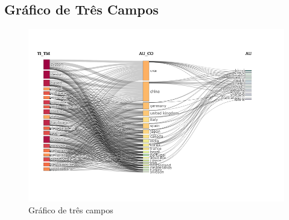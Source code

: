 \subsection{Gráfico de Três Campos}

\begin{figure}[ht]
    \centering
    \includegraphics[width=12cm]{experiments/GMalme/AnaliseBibliometrica/ImpactoDeJogosNaTecnologia/Figs/Three-Fields Plot.png}
    \caption{Gráfico de três campos}
    \label{fig:AIJ_graficoCampos}
\end{figure}

